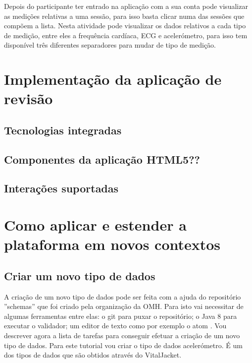 Depois do participante ter entrado na aplicação com a sua conta pode visualizar as medições relativas a uma sessão, para isso basta clicar numa das sessões que compõem a lista. Nesta atividade pode visualizar os dados relativos a cada tipo de medição, entre eles a frequência cardíaca, \gls{ECG} e acelerómetro, para isso tem disponível três diferentes separadores para mudar de tipo de medição.




\section{Implementação da aplicação de revisão}
\subsection{Tecnologias integradas}


\subsection{Componentes da aplicação HTML5??}

\subsection{Interações suportadas }






\section{Como aplicar e estender a plataforma em novos contextos}


\subsection{Criar um novo tipo de dados}

A criação de um novo tipo de dados pode ser feita com a ajuda do repositório ''schemas'' \cite{schemas-rep} que foi criado pela organização da \gls{OMH}. Para isto vai necessitar de algumas ferramentas entre elas: o git \cite{git-install} para puxar o repositório; o Java 8 \cite{java-overview} para executar o validador; um editor de texto como por exemplo o atom \cite{atom-install}. Vou descrever agora a lista de tarefas para conseguir efetuar a criação de um novo tipo de dados. Para este tutorial vou criar o tipo de dados acelerómetro. É um dos tipos de dados que são obtidos através do VitalJacket.

